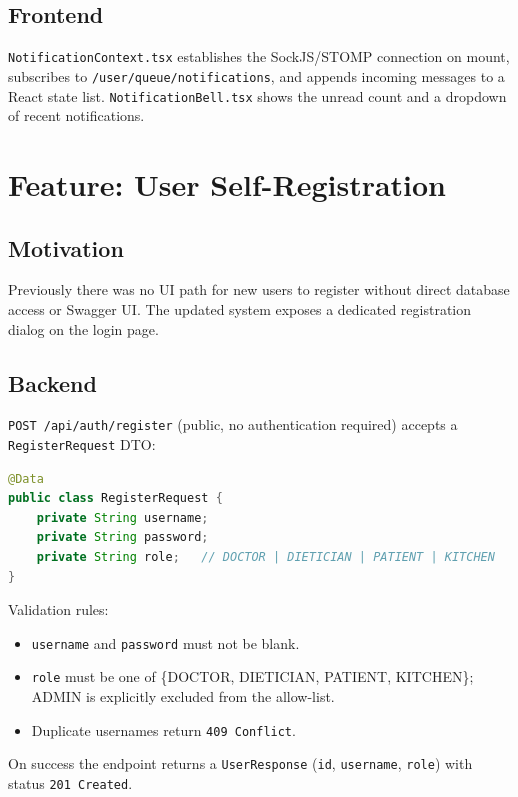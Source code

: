 \documentclass[12pt,a4paper]{article}
\begin{document}
\subsection{Frontend}
\texttt{NotificationContext.tsx} establishes the SockJS/STOMP connection on mount,
subscribes to \texttt{/user/queue/notifications}, and appends incoming messages
to a React state list.  \texttt{NotificationBell.tsx} shows the unread count and
a dropdown of recent notifications.

\section{Feature: User Self-Registration}

\subsection{Motivation}
Previously there was no UI path for new users to register without
direct database access or Swagger UI.  The updated system exposes a
dedicated registration dialog on the login page.

\subsection{Backend}
\texttt{POST /api/auth/register} (public, no authentication required) accepts
a \texttt{RegisterRequest} DTO:
\begin{lstlisting}[language=Java, caption={RegisterRequest.java}]
@Data
public class RegisterRequest {
    private String username;
    private String password;
    private String role;   // DOCTOR | DIETICIAN | PATIENT | KITCHEN
}
\end{lstlisting}

Validation rules:
\begin{itemize}[noitemsep]
  \item \texttt{username} and \texttt{password} must not be blank.
  \item \texttt{role} must be one of \{DOCTOR, DIETICIAN, PATIENT, KITCHEN\};
        ADMIN is explicitly excluded from the allow-list.
  \item Duplicate usernames return \texttt{409 Conflict}.
\end{itemize}

On success the endpoint returns a \texttt{UserResponse} (\texttt{id},
\texttt{username}, \texttt{role}) with status \texttt{201 Created}.
\end{document}
